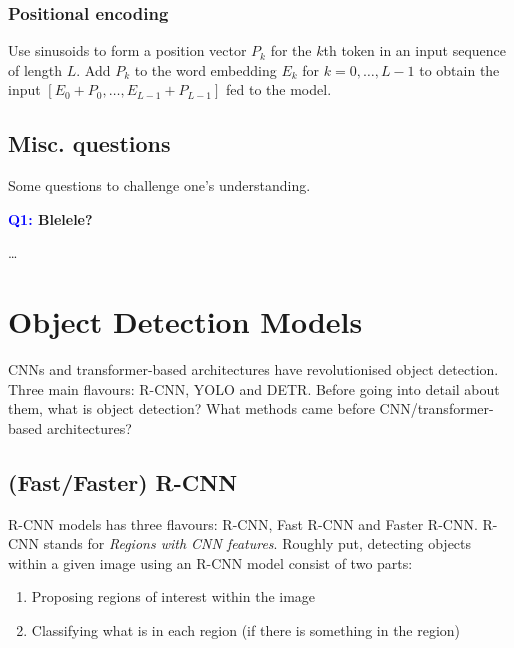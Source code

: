 \documentclass[11pt]{article}
\begin{document}
\subsubsection{Positional encoding}
Use sinusoids to form a position vector $P_k$ for the $k$th token in an input sequence of length $L$. Add $P_k$ to the word embedding $E_k$ for $k=0,\dots,L-1$ to obtain the input $[E_0+P_0,\dots,E_{L-1}+P_{L-1}]$ fed to the model.

\subsection{Misc. questions}

Some questions to challenge one's understanding.

\begin{center}
    \textbf{\textcolor{blue}{Q1:} Blelele?}
\end{center}
\dots

\section{Object Detection Models}

CNNs and transformer-based architectures have revolutionised object detection. Three main flavours: R-CNN, YOLO and DETR. Before going into detail about them, what is object detection? What methods came before CNN/transformer-based architectures?

\subsection{(Fast/Faster) R-CNN}
R-CNN models has three flavours: R-CNN, Fast R-CNN and Faster R-CNN. R-CNN stands for \textit{Regions with CNN features}. Roughly put, detecting objects within a given image using an R-CNN model consist of two parts:
\begin{enumerate}
    \item Proposing regions of interest within the image
    \item Classifying what is in each region (if there is something in the region)
\end{enumerate}
\end{document}
